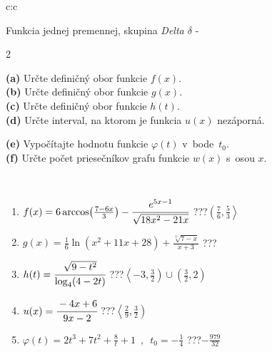 \documentclass[10pt]{report}
\begin{document}
\begin{tabular}{c:c}
\begin{minipage}[c][104.5mm][t]{0.5\linewidth}
\begin{center}
\vspace{7mm}
{\huge Funkcia jednej premennej, skupina \textit{Delta $\delta$} -}\\[5mm]
\begin{minipage}{0.95\linewidth}
\begin{center}
{\small \begin{multicols}{2} \raggedright
\textbf{(a)} Určte definičný obor funkcie \(f(x)\). \\[1mm]
\textbf{(b)} Určte definičný obor funkcie \(g(x)\). \\[1mm]
\textbf{(c)} Určte definičný obor funkcie \(h(t)\). \\[1mm]
\textbf{(d)} Určte interval, na ktorom je funkcia \(u(x)\) nezáporná. \par \columnbreak
\textbf{(e)} Vypočítajte hodnotu funkcie \(\varphi(t)\) v~bode~\(t_0\). \\[1mm]
\textbf{(f)} Určte počet priesečníkov grafu funkcie \(w(x)\) s~osou \(x\). \\[1mm]
\end{multicols}
}
\end{center}
\end{minipage}
\\[4mm]
\begin{minipage}{0.79\linewidth}
\begin{center}
\begin{varwidth}{\linewidth}
\begin{enumerate}
\small
\item $f(x) = 6\arccos\!\left( \frac{7-6x}{3} \right) - \cfrac{e^{5x-1}}{\sqrt{18x^2-21x}}$\quad \dotfill\; ???\;\dotfill \quad $\left(\frac{7}{6} , \frac{5}{3}\right\rangle$
\item $g(x) = \frac{1}{6} \ln{\!(x^2+11x+28)}+\frac{\sqrt[3]{7-x}}{x+3}$\quad \dotfill\; ???\;\dotfill {}
\item $h(t) = \cfrac{\sqrt{9-t^2}}{\log_4(4-2t)}$\quad \dotfill\; ???\;\dotfill \quad $\left\langle-3 , \frac{3}{2}\right)\cup\left(\frac{3}{2} , 2\right)$
\item $u(x) = \cfrac{-4x+6}{9x-2}$\quad \dotfill\; ???\;\dotfill \quad $\left\langle\frac{2}{9} , \frac{3}{2}\right)$
\item $\varphi(t) = 2t^3+7t^2+\frac{8}{t}+1 \enspace , \enspace t_0=-\frac{1}{4}$\quad \dotfill\; ???\;\dotfill \quad $-\frac{979}{32}$

\end{enumerate}
\end{varwidth}
\end{center}
\end{minipage}
\end{center}
\end{minipage}
\end{tabular}
\end{document}
